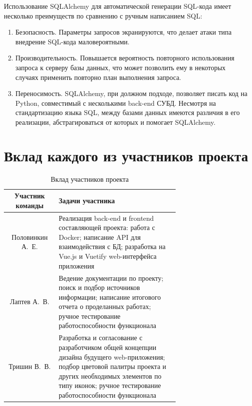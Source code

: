\documentclass{altsu-report}
\begin{document}
Использование SQLAlchemy для автоматической генерации SQL-кода имеет несколько преимуществ по сравнению с ручным написанием SQL:

\begin{enumerate}
    \item Безопасность. Параметры запросов экранируются, что делает атаки типа внедрение SQL-кода маловероятными.

    \item Производительность. Повышается вероятность повторного использования запроса к серверу базы данных, что может позволить ему в некоторых случаях применить повторно план выполнения запроса.

    \item Переносимость. SQLAlchemy, при должном подходе, позволяет писать код на Python, совместимый с несколькими back-end СУБД. Несмотря на стандартизацию языка SQL, между базами данных имеются различия в его реализации, абстрагироваться от которых и помогает SQLAlchemy.
\end{enumerate}

\chapter*{Вклад каждого из участников проекта}

\begin{table}[H]
    \centering
    \begin{tabular}{|c|p{0.7\linewidth}|}
        \hline
        Участник команды & Задачи участника \\
        \hline
        Половинкин А.~Е. & Реализация back-end и frontend составляющей проекта: работа с Docker; написание API для взаимодействия с БД; разработка на Vue.js и Vuetify web-интерфейса приложения \\
        \hline
        Лаптев А.~В. & Ведение документации по проекту; поиск и подбор источников информации; написание итогового отчета о проделанных работах; ручное тестирование работоспособности функционала \\
        \hline
        Тришин В.~В. & Разработка и согласование с разработчиком общей концепции дизайна будущего web-приложения; подбор цветовой палитры проекта и других необходимых элементов по типу иконок; ручное тестирование работоспособности функционала \\
        \hline
    \end{tabular}
    \caption{Вклад участников проекта}
    \label{tab:command}
\end{table}
\end{document}
